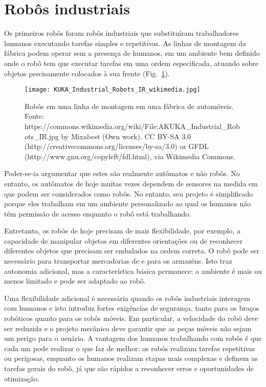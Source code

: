 \section{Robôs industriais}

Os primeiros robôs foram robôs industriais que substituíram trabalhadores humanos executando tarefas simples e repetitivas. As linhas de montagem da fábrica podem operar sem a presença de humanos, em um ambiente bem definido onde o robô tem que executar tarefas em uma ordem especificada, atuando sobre objetos precisamente colocados à sua frente (Fig.~\ref{fig.assemblyline}). 

\begin{figure}
\begin{center}
\texttt{[image: KUKA\_Industrial\_Robots\_IR\_wikimedia.jpg]}
\end{center}
\caption{Robôs em uma linha de montagem em uma fábrica de automóveis. Fonte: https://commons.wikimedia.org/wiki/File:AKUKA\_Industrial\_Robots\_IR.jpg by Mixabest (Own work). CC BY-SA 3.0 (http://creativecommons.org/licenses/by-sa/3.0) or GFDL (http://www.gnu.org/copyleft/fdl.html), via Wikimedia Commons.}\label{fig.assemblyline}
\end{figure}

Poder-se-ia argumentar que estes são realmente autômatos e não robôs. No entanto, os autômatos de hoje muitas vezes dependem de sensores na medida em que podem ser considerados como robôs. No entanto, seu projeto é simplificado porque eles trabalham em um ambiente personalizado ao qual os humanos não têm permissão de acesso enquanto o robô está trabalhando.

Entretanto, os robôs de hoje precisam de mais flexibilidade, por exemplo, a capacidade de manipular objetos em diferentes orientações ou de reconhecer diferentes objetos que precisam ser embalados na ordem correta. O robô pode ser necessário para transportar mercadorias de e para os armazéns. Isto traz autonomia adicional, mas a característica básica permanece: o ambiente é mais ou menos limitado e pode ser adaptado ao robô.

Uma flexibilidade adicional é necessária quando os robôs industriais interagem com humanos e isto introduz fortes exigências de segurança, tanto para os braços robóticos quanto para os robôs móveis. Em particular, a velocidade do robô deve ser reduzida e o projeto mecânico deve garantir que as peças móveis não sejam um perigo para o usuário. A vantagem dos humanos trabalhando com robôs é que cada um pode realizar o que faz de melhor: os robôs realizam tarefas repetitivas ou perigosas, enquanto os humanos realizam etapas mais complexas e definem as tarefas gerais do robô, já que são rápidos a reconhecer erros e oportunidades de otimização.

